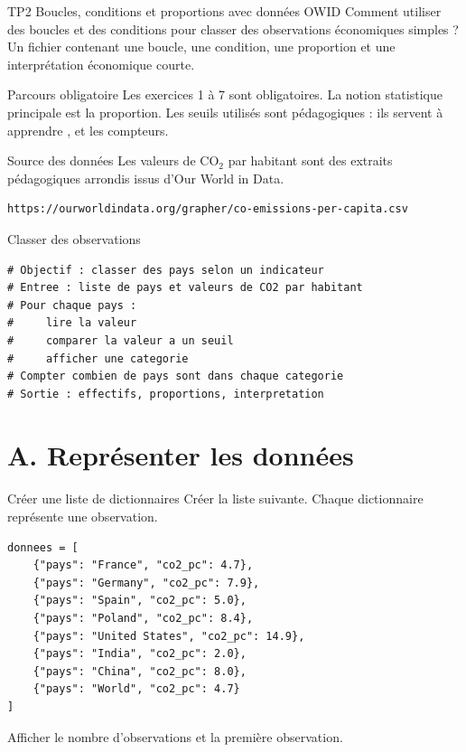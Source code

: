 \documentclass[11pt,a4paper]{article}
\begin{document}
\workbooktitle
  {TP2}
  {Boucles, conditions et proportions avec données OWID}
  {Comment utiliser des boucles et des conditions pour classer des observations économiques simples ?}
  {Un fichier  contenant une boucle, une condition, une proportion et une interprétation économique courte.}

\begin{checkpointbox}{Parcours obligatoire}
Les exercices 1 à 7 sont obligatoires. La notion statistique principale est la proportion. Les seuils utilisés sont pédagogiques : ils servent à apprendre ,  et les compteurs.
\end{checkpointbox}

\begin{checkpointbox}{Source des données}
Les valeurs de CO$_2$ par habitant sont des extraits pédagogiques arrondis issus d'Our World in Data.
\begin{lstlisting}[language=terminal]
https://ourworldindata.org/grapher/co-emissions-per-capita.csv
\end{lstlisting}
\end{checkpointbox}

\begin{pseudocodeexercise}{Classer des observations}
\begin{lstlisting}
# Objectif : classer des pays selon un indicateur
# Entree : liste de pays et valeurs de CO2 par habitant
# Pour chaque pays :
#     lire la valeur
#     comparer la valeur a un seuil
#     afficher une categorie
# Compter combien de pays sont dans chaque categorie
# Sortie : effectifs, proportions, interpretation
\end{lstlisting}
\end{pseudocodeexercise}

\section*{A. Représenter les données}

\begin{mandatoryexercise}{Créer une liste de dictionnaires}
Créer la liste suivante. Chaque dictionnaire représente une observation.
\begin{lstlisting}
donnees = [
    {"pays": "France", "co2_pc": 4.7},
    {"pays": "Germany", "co2_pc": 7.9},
    {"pays": "Spain", "co2_pc": 5.0},
    {"pays": "Poland", "co2_pc": 8.4},
    {"pays": "United States", "co2_pc": 14.9},
    {"pays": "India", "co2_pc": 2.0},
    {"pays": "China", "co2_pc": 8.0},
    {"pays": "World", "co2_pc": 4.7}
]
\end{lstlisting}
Afficher le nombre d'observations et la première observation.
\end{mandatoryexercise}
\end{document}
